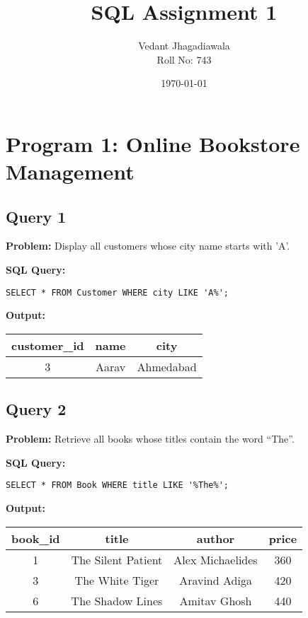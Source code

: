 \documentclass[12pt]{article}
\title{\textbf{SQL Assignment 1}}
\author{Vedant Jhagadiawala \\ Roll No: 743}
\date{\today}
\begin{document}
\maketitle

\section*{Program 1: Online Bookstore Management}

\subsection*{Query 1}
\textbf{Problem:} Display all customers whose city name starts with 'A'.  

\textbf{SQL Query:}  
\begin{verbatim}
SELECT * FROM Customer WHERE city LIKE 'A%';
\end{verbatim}

\textbf{Output:}

\begin{tabular}{|c|c|c|}
\hline
customer\_id & name & city \\
\hline
3 & Aarav & Ahmedabad \\
\hline
\end{tabular}

\vspace{0.5cm}

\subsection*{Query 2}
\textbf{Problem:} Retrieve all books whose titles contain the word ``The''.  

\textbf{SQL Query:}  
\begin{verbatim}
SELECT * FROM Book WHERE title LIKE '%The%';
\end{verbatim}

\textbf{Output:}

\begin{tabular}{|c|c|c|c|}
\hline
book\_id & title & author & price \\
\hline
1 & The Silent Patient & Alex Michaelides & 360 \\
3 & The White Tiger & Aravind Adiga & 420 \\
6 & The Shadow Lines & Amitav Ghosh & 440 \\
\hline
\end{tabular}

\vspace{0.5cm}
\end{document}
